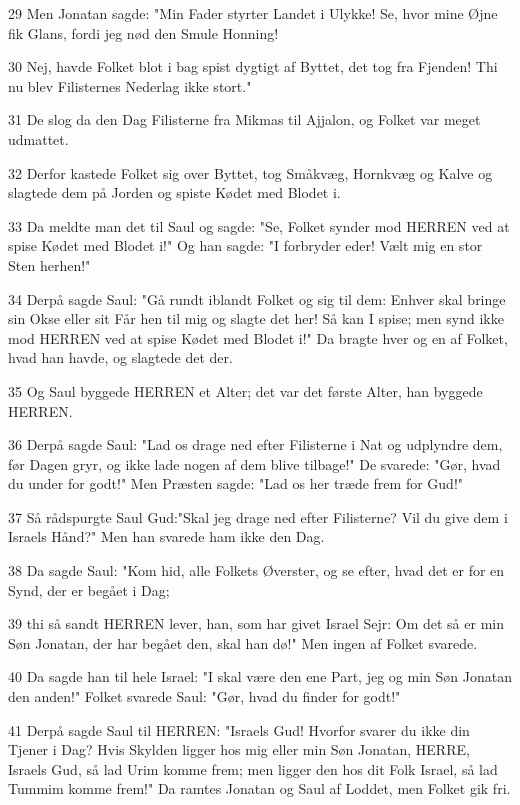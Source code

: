 \par 29 Men Jonatan sagde: "Min Fader styrter Landet i Ulykke! Se, hvor mine Øjne fik Glans, fordi jeg nød den Smule Honning!
\par 30 Nej, havde Folket blot i bag spist dygtigt af Byttet, det tog fra Fjenden! Thi nu blev Filisternes Nederlag ikke stort."
\par 31 De slog da den Dag Filisterne fra Mikmas til Ajjalon, og Folket var meget udmattet.
\par 32 Derfor kastede Folket sig over Byttet, tog Småkvæg, Hornkvæg og Kalve og slagtede dem på Jorden og spiste Kødet med Blodet i.
\par 33 Da meldte man det til Saul og sagde: "Se, Folket synder mod HERREN ved at spise Kødet med Blodet i!" Og han sagde: "I forbryder eder! Vælt mig en stor Sten herhen!"
\par 34 Derpå sagde Saul: "Gå rundt iblandt Folket og sig til dem: Enhver skal bringe sin Okse eller sit Får hen til mig og slagte det her! Så kan I spise; men synd ikke mod HERREN ved at spise Kødet med Blodet i!" Da bragte hver og en af Folket, hvad han havde, og slagtede det der.
\par 35 Og Saul byggede HERREN et Alter; det var det første Alter, han byggede HERREN.
\par 36 Derpå sagde Saul: "Lad os drage ned efter Filisterne i Nat og udplyndre dem, før Dagen gryr, og ikke lade nogen af dem blive tilbage!" De svarede: "Gør, hvad du under for godt!" Men Præsten sagde: "Lad os her træde frem for Gud!"
\par 37 Så rådspurgte Saul Gud:"Skal jeg drage ned efter Filisterne? Vil du give dem i Israels Hånd?" Men han svarede ham ikke den Dag.
\par 38 Da sagde Saul: "Kom hid, alle Folkets Øverster, og se efter, hvad det er for en Synd, der er begået i Dag;
\par 39 thi så sandt HERREN lever, han, som har givet Israel Sejr: Om det så er min Søn Jonatan, der har begået den, skal han dø!" Men ingen af Folket svarede.
\par 40 Da sagde han til hele Israel: "I skal være den ene Part, jeg og min Søn Jonatan den anden!" Folket svarede Saul: "Gør, hvad du finder for godt!"
\par 41 Derpå sagde Saul til HERREN: "Israels Gud! Hvorfor svarer du ikke din Tjener i Dag? Hvis Skylden ligger hos mig eller min Søn Jonatan, HERRE, Israels Gud, så lad Urim komme frem; men ligger den hos dit Folk Israel, så lad Tummim komme frem!" Da ramtes Jonatan og Saul af Loddet, men Folket gik fri.
